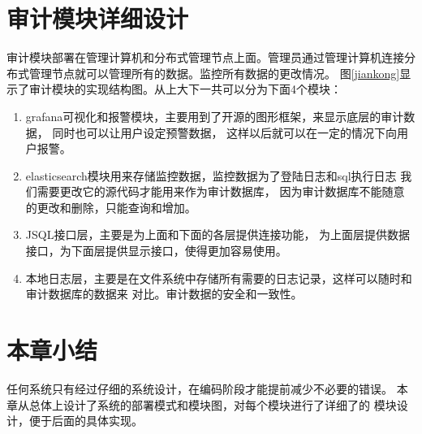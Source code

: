 \section{审计模块详细设计}
审计模块部署在管理计算机和分布式管理节点上面。管理员通过管理计算机连接分布式管理节点就可以管理所有的数据。监控所有数据的更改情况。
图\ref{jiankong}显示了审计模块的实现结构图。从上大下一共可以分为下面4个模块：
\begin{enumerate}[fullwidth,itemindent=2em,listparindent=2em]
	\item grafana可视化和报警模块，主要用到了开源的图形框架，来显示底层的审计数据，
	同时也可以让用户设定预警数据，
	这样以后就可以在一定的情况下向用户报警。
	\item elasticsearch模块用来存储监控数据，监控数据为了登陆日志和sql执行日志
	我们需要更改它的源代码才能用来作为审计数据库，
	因为审计数据库不能随意的更改和删除，只能查询和增加。
	\item JSQL接口层，主要是为上面和下面的各层提供连接功能，
	为上面层提供数据接口，为下面层提供显示接口，使得更加容易使用。
	\item 本地日志层，主要是在文件系统中存储所有需要的日志记录，这样可以随时和审计数据库的数据来
	对比。审计数据的安全和一致性。
\end{enumerate}
\section{本章小结}
任何系统只有经过仔细的系统设计，在编码阶段才能提前减少不必要的错误。
本章从总体上设计了系统的部署模式和模块图，对每个模块进行了详细了的
模块设计，便于后面的具体实现。